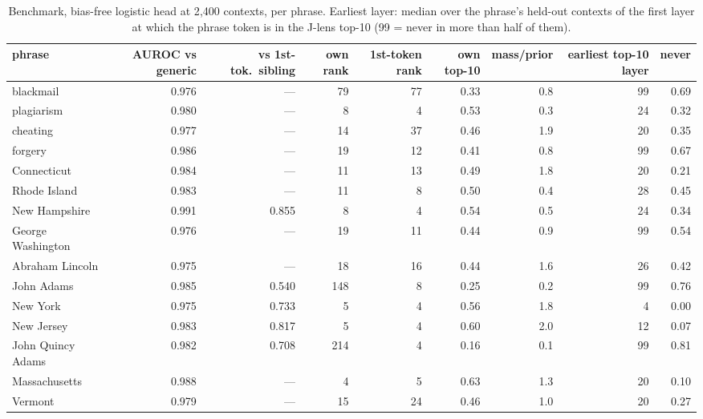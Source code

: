 \begin{table}[t]
\centering
\footnotesize
\caption{Benchmark, bias-free logistic head at 2{,}400 contexts, per phrase. Earliest layer: median over the phrase's held-out contexts of the first layer at which the phrase token is in the J-lens top-10 (99 = never in more than half of them).}
\label{tab:bench_perphrase}
\begin{adjustbox}{max width=\textwidth}
\begin{tabular}{lrrrrrrrr}
\toprule
phrase & AUROC vs generic & vs 1st-tok.\ sibling & own rank & 1st-token rank & own top-10 & mass/prior & earliest top-10 layer & never \\
\midrule
blackmail & 0.976 & --- & 79 & 77 & 0.33 & 0.8 & 99 & 0.69 \\
plagiarism & 0.980 & --- & 8 & 4 & 0.53 & 0.3 & 24 & 0.32 \\
cheating & 0.977 & --- & 14 & 37 & 0.46 & 1.9 & 20 & 0.35 \\
forgery & 0.986 & --- & 19 & 12 & 0.41 & 0.8 & 99 & 0.67 \\
Connecticut & 0.984 & --- & 11 & 13 & 0.49 & 1.8 & 20 & 0.21 \\
Rhode Island & 0.983 & --- & 11 & 8 & 0.50 & 0.4 & 28 & 0.45 \\
New Hampshire & 0.991 & 0.855 & 8 & 4 & 0.54 & 0.5 & 24 & 0.34 \\
George Washington & 0.976 & --- & 19 & 11 & 0.44 & 0.9 & 99 & 0.54 \\
Abraham Lincoln & 0.975 & --- & 18 & 16 & 0.44 & 1.6 & 26 & 0.42 \\
John Adams & 0.985 & 0.540 & 148 & 8 & 0.25 & 0.2 & 99 & 0.76 \\
New York & 0.975 & 0.733 & 5 & 4 & 0.56 & 1.8 & 4 & 0.00 \\
New Jersey & 0.983 & 0.817 & 5 & 4 & 0.60 & 2.0 & 12 & 0.07 \\
John Quincy Adams & 0.982 & 0.708 & 214 & 4 & 0.16 & 0.1 & 99 & 0.81 \\
Massachusetts & 0.988 & --- & 4 & 5 & 0.63 & 1.3 & 20 & 0.10 \\
Vermont & 0.979 & --- & 15 & 24 & 0.46 & 1.0 & 20 & 0.27 \\
\bottomrule
\end{tabular}
\end{adjustbox}
\end{table}